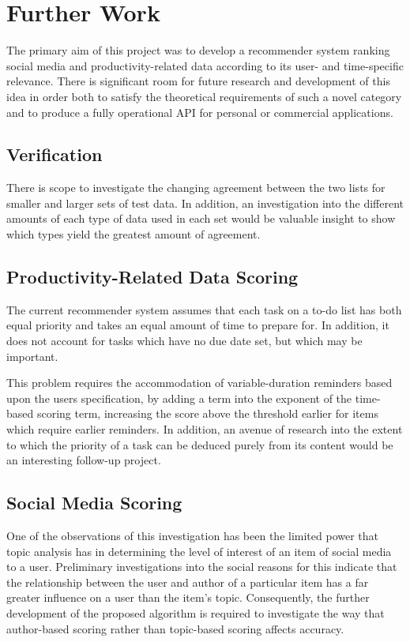 \chapter{Further Work}

The primary aim of this project was to develop a recommender system ranking social media and productivity-related data according to its user- and time-specific relevance. There is significant room for future research and development of this idea in order both to satisfy the theoretical requirements of such a novel category  and to produce a fully operational API for personal or commercial applications. 

\section{Verification}

There is scope to investigate the changing agreement between the two lists for smaller and larger sets of test data. In addition, an investigation into the different amounts of each type of data used in each set would be valuable insight to show which types yield the greatest amount of agreement. 

\section{Productivity-Related Data Scoring}

The current recommender system assumes that each task on a to-do list has both equal priority and takes an equal amount of time to prepare for. In addition, it does not account for tasks which have no due date set, but which may be important.

This problem requires the accommodation of variable-duration reminders based upon the users specification, by adding a term into the exponent of the time-based scoring term, increasing the score above the threshold earlier for items which require earlier reminders. In addition, an avenue of research into the extent to which the priority of a task can be deduced purely from its content would be an interesting follow-up project.

\section{Social Media Scoring}

One of the observations of this investigation has been the limited power that topic analysis has in determining the level of interest of an item of social media to a user. Preliminary investigations into the social reasons for this indicate that the relationship between the user and author of a particular item has a far greater influence on a user than the item's topic. Consequently, the further development of the proposed algorithm is required to investigate the way that author-based scoring rather than topic-based scoring affects accuracy. 

